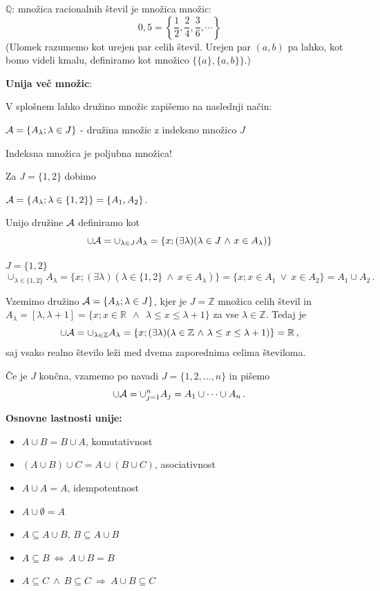 \documentclass[11pt,paper=b5,footinclude,headinclude]{scrbook} %
\newcounter{example}
\def\ali {{~\vee~}}
\def\inn {{~\wedge~}}
\def\sledi {{~\Rightarrow~}}
\def\cee {{~\Leftrightarrow~}}
\begin{document}
\begin{example*}
$\mathbb{Q}$: množica racionalnih števil je množica množic:
$$0,5 = \left\{\frac{1}{2}, \frac{2}{4}, \frac{3}{6}, \cdots\right\}$$
(Ulomek razumemo kot urejen par celih števil. Urejen par $(a,b)$ pa lahko, kot bomo videli kmalu, definiramo kot množico $\{\{a\},\{a,b\}\}$.)\end{example*}

\medskip

\textbf{ Unija več množic}:

V splošnem lahko družino množic zapišemo na naslednji način:

${\cal A} = \{A_\lambda; \lambda \in J\}$ - družina množic z indeksno množico $J$

Indeksna množica je poljubna množica!

\medskip
\begin{example*}
Za $J = \{1,2\}$ dobimo

${\cal A} = \{A_\lambda; \lambda \in \{1,2\}\} = \{A_1,A_2\}$.\end{example*}

\medskip
Unijo družine ${\cal A}$ definiramo kot
$$\cup {\cal A} = \cup_{\lambda \in J} A_\lambda = \{x;(\exists \lambda) (\lambda \in J\inn x\in A_\lambda)\}$$

\medskip
\begin{example*} $J = \{1,2\}$
$$\cup_{\lambda \in \{1,2\}} A_\lambda = \{x;(\exists \lambda) (\lambda \in \{1,2\}\inn x\in A_\lambda)\}= \{x;x\in A_1 \ali x\in A_2\} = A_1\cup A_2\,.$$
\end{example*}

\medskip
\begin{example*}
Vzemimo družino
${\cal A} = \{A_\lambda; \lambda \in J\}$, kjer je $J = \mathbb{Z}$ množica celih števil
in $A_\lambda = [\lambda,\lambda+1] = \{x; x\in \mathbb{R}~\inn~\lambda\le x\le \lambda +1\}$ za vse $\lambda\in \mathbb{Z}$.
Tedaj je
$$\cup {\cal A} = \cup_{\lambda\in \mathbb{Z}}A_\lambda
= \{x;(\exists \lambda) (\lambda \in \mathbb{Z}\inn \lambda \le x\le \lambda +1)\} = \mathbb{R}\,,$$
saj vsako realno število leži med dvema zaporednima celima številoma.\end{example*}

\medskip
Če je $J$ končna, vzamemo po navadi $J = \{1,2,\ldots, n\}$ in pišemo
$$\cup {\cal A} = \cup_{j = 1}^nA_j = A_1\cup\cdots\cup A_n\,.$$


\bigskip
\textbf{ Osnovne lastnosti unije:}
\begin{itemize}
  \item $A\cup B = B\cup A$, komutativnost
  \item $(A\cup B)\cup C = A\cup (B\cup C)$, asociativnost
  \item $A\cup A = A$, idempotentnost
  \item $A\cup \emptyset = A$
  \item $A\subseteq A\cup B$, $B\subseteq A\cup B$
  \item $A\subseteq B\cee A\cup B = B$
  \item $A\subseteq C\inn B\subseteq C\sledi A\cup B \subseteq C$
\end{itemize}
\end{document}
